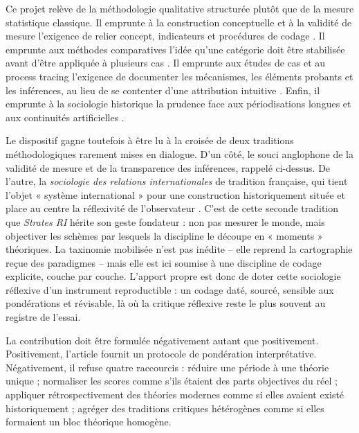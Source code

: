 \documentclass[11pt,a4paper]{article}
\begin{document}
Ce projet relève de la méthodologie qualitative structurée plutôt que de la mesure statistique classique. Il emprunte à la construction conceptuelle et à la validité de mesure l'exigence de relier concept, indicateurs et procédures de codage \citep{adcock2001measurement,goertz2006social,collier1997democracy}. Il emprunte aux méthodes comparatives l'idée qu'une catégorie doit être stabilisée avant d'être appliquée à plusieurs cas \citep{ragin1987comparative}. Il emprunte aux études de cas et au process tracing l'exigence de documenter les mécanismes, les éléments probants et les inférences, au lieu de se contenter d'une attribution intuitive \citep{george2005case,gerring2007case,brady2010rethinking,bennett2015process}. Enfin, il emprunte à la sociologie historique la prudence face aux périodisations longues et aux continuités artificielles \citep{tilly1992coercion,hobsbawm1994age,kennedy1987rise}.

Le dispositif gagne toutefois à être lu à la croisée de deux traditions méthodologiques rarement mises en dialogue. D'un côté, le souci anglophone de la validité de mesure et de la transparence des inférences, rappelé ci-dessus. De l'autre, la \emph{sociologie des relations internationales} de tradition française, qui tient l'objet « système international » pour une construction historiquement située et place au centre la réflexivité de l'observateur \citep{merle1988sociologie,badie1992retournement,devin2002sociologie}. C'est de cette seconde tradition que \emph{Strates RI} hérite son geste fondateur : non pas mesurer le monde, mais objectiver les schèmes par lesquels la discipline le découpe en « moments » théoriques. La taxinomie mobilisée n'est pas inédite -- elle reprend la cartographie reçue des paradigmes \citep{battistella2012theories} -- mais elle est ici soumise à une discipline de codage explicite, couche par couche. L'apport propre est donc de doter cette sociologie réflexive d'un instrument reproductible : un codage daté, sourcé, sensible aux pondérations et révisable, là où la critique réflexive reste le plus souvent au registre de l'essai.

La contribution doit être formulée négativement autant que positivement. Positivement, l'article fournit un protocole de pondération interprétative. Négativement, il refuse quatre raccourcis : réduire une période à une théorie unique ; normaliser les scores comme s'ils étaient des parts objectives du réel ; appliquer rétrospectivement des théories modernes comme si elles avaient existé historiquement ; agréger des traditions critiques hétérogènes comme si elles formaient un bloc théorique homogène.
\end{document}
